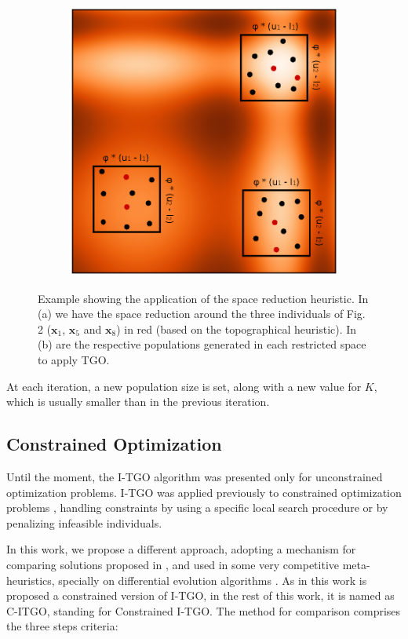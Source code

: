 \begin{figure}[tp]
\begin{subfigure}{.5\textwidth}
  \includegraphics[width=1.1\linewidth]{fig_3.eps}
  \caption{}
  \label{fig:SpaceReduction-b}
\end{subfigure}
\caption{Example showing the application of the space reduction heuristic. In (a) we have the space reduction around the three individuals of Fig. 2 ($\bm{x}_1$, $\bm{x}_5$ and $\bm{x}_8$) in red (based on the topographical heuristic). In (b) are the respective populations generated in each restricted space to apply TGO.}\label{fig:SpaceReduction}
\end{figure}


At each iteration, a new population size is set, along with a new value for $K$, which is usually smaller than in the previous iteration.


\subsection{Constrained Optimization}

Until the moment, the I-TGO algorithm was presented only for unconstrained optimization problems. I-TGO was applied previously to constrained optimization problems \citep{ITGO2, ITGO3}, handling constraints by using a specific local search procedure or by penalizing infeasible individuals.

In this work, we propose a different approach, adopting a mechanism for comparing solutions proposed in \cite{ConHandling}, and used in some very competitive meta-heuristics, specially on differential evolution algorithms \citep{DE1, DE2, DE3}. As in this work is proposed a constrained version of I-TGO, in the rest of this work, it is named as C-ITGO, standing for Constrained I-TGO. The method for comparison comprises the three steps criteria:

